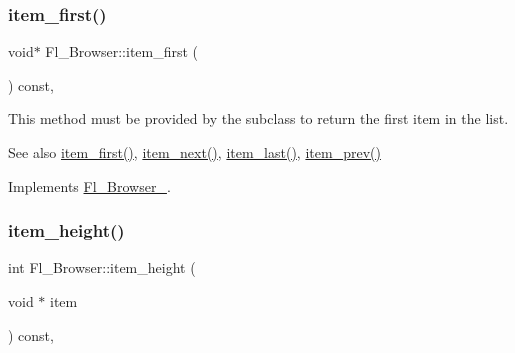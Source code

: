 \mbox{\label{class_fl___browser_a7822c6d04744af8f9ffa7a1e0c46955c}} 
\subsubsection{\texorpdfstring{item\+\_\+first()}{item\_first()}}
{\footnotesize\ttfamily void$\ast$ Fl\+\_\+\+Browser\+::item\+\_\+first (\begin{DoxyParamCaption}{ }\end{DoxyParamCaption}) const\hspace{0.3cm}{\ttfamily [protected]}, {\ttfamily [virtual]}}

This method must be provided by the subclass to return the first item in the list. \begin{DoxySeeAlso}{See also}
\hyperlink{class_fl___browser_a7822c6d04744af8f9ffa7a1e0c46955c}{item\+\_\+first()}, \hyperlink{class_fl___browser_aca0d9393c07552ce4ee75a9a10dbe93e}{item\+\_\+next()}, \hyperlink{class_fl___browser_a5de7360f3e39ad20c3bf552893a92626}{item\+\_\+last()}, \hyperlink{class_fl___browser_a0fbf4d057bc1b7afcdd872b78ee8526b}{item\+\_\+prev()} 
\end{DoxySeeAlso}


Implements \hyperlink{class_fl___browser___a43dd6231f2684f132a5a33b5d7d0c8e7}{Fl\+\_\+\+Browser\+\_\+}.

\mbox{\label{class_fl___browser_a57103fdfb68bbe7ebb8bbe133ebe9009}} 
\subsubsection{\texorpdfstring{item\+\_\+height()}{item\_height()}}
{\footnotesize\ttfamily int Fl\+\_\+\+Browser\+::item\+\_\+height (\begin{DoxyParamCaption}\item[{void $\ast$}]{item }\end{DoxyParamCaption}) const\hspace{0.3cm}{\ttfamily [protected]}, {\ttfamily [virtual]}}

